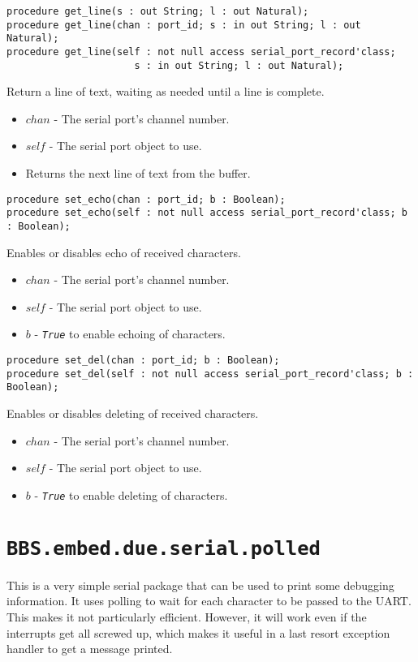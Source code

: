 \documentclass[10pt, openany]{book}
\newcommand{\indexfunc}[1]{\index[func]{#1}}
\newcommand{\package}[1]{\texttt{#1}}
\newcommand{\constant}[1]{\emph{\texttt{#1}}}
\begin{document}
\begin{lstlisting}
procedure get_line(s : out String; l : out Natural);
procedure get_line(chan : port_id; s : in out String; l : out Natural);
procedure get_line(self : not null access serial_port_record'class;
                      s : in out String; l : out Natural);
\end{lstlisting}
\indexfunc{get\_line}
Return a line of text, waiting as needed until a line is complete.
\begin{itemize}
  \item $chan$ - The serial port's channel number.
  \item $self$ - The serial port object to use.
  \item Returns the next line of text from the buffer.
\end{itemize}

\begin{lstlisting}
procedure set_echo(chan : port_id; b : Boolean);
procedure set_echo(self : not null access serial_port_record'class; b : Boolean);
\end{lstlisting}
\indexfunc{set\_echo}
Enables or disables echo of received characters.
\begin{itemize}
  \item $chan$ - The serial port's channel number.
  \item $self$ - The serial port object to use.
  \item $b$ - \constant{True} to enable echoing of characters.
\end{itemize}

\begin{lstlisting}
procedure set_del(chan : port_id; b : Boolean);
procedure set_del(self : not null access serial_port_record'class; b : Boolean);
\end{lstlisting}
\indexfunc{set\_del}
Enables or disables deleting of received characters.
\begin{itemize}
  \item $chan$ - The serial port's channel number.
  \item $self$ - The serial port object to use.
  \item $b$ - \constant{True} to enable deleting of characters.
\end{itemize}

\section{\package{BBS.embed.due.serial.polled}}
This is a very simple serial package that can be used to print some debugging information.  It uses polling to wait for each character to be passed to the UART.  This makes it not particularly efficient. However, it will work even if the interrupts get all screwed up, which makes it useful in a last resort exception handler to get a message printed.
\end{document}
